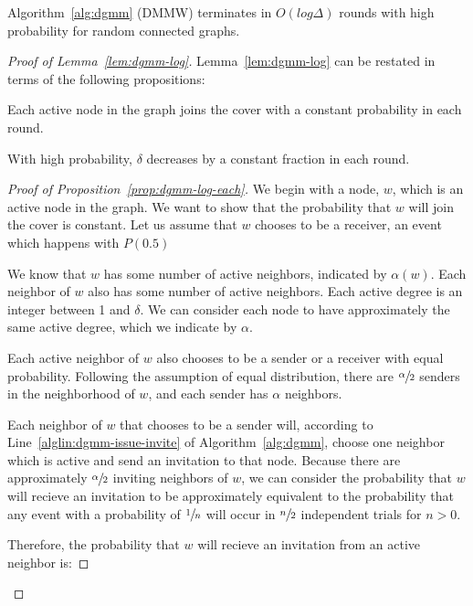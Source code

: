 \begin{lem}
\label{lem:dgmm-log}
Algorithm~\ref{alg:dgmm} (DMMW) terminates in $O(log \Delta)$ rounds with high probability for random connected graphs.
\end{lem}


\begin{proof}[Proof of Lemma~\ref{lem:dgmm-log}]


Lemma~\ref{lem:dgmm-log} can be restated in terms of the following propositions:
\begin{lprp}
\label{prop:dgmm-log-each}
Each active node in the graph joins the cover with a constant probability in each round.
\end{lprp}
\begin{lprp}
\label{prop:dgmm-log-alpha}
With high probability, $\delta$ decreases by a constant fraction in each round.
\end{lprp}
\begin{proof}[Proof of Proposition~\ref{prop:dgmm-log-each}]

We begin with a node, $w$, which is an active node in the graph. We want to show that the probability that $w$ will join the cover is constant. Let us assume that $w$ chooses to be a receiver, an event which happens with $P(0.5)$

We know that $w$ has some number of active neighbors, indicated by $\alpha(w)$. Each neighbor of $w$ also has some number of active neighbors. Each active degree is an integer between 1 and $\delta$. We can consider each node to have approximately the same active degree, which we indicate by $\alpha$. 

Each active neighbor of $w$ also chooses to be a sender or a receiver with equal probability. Following the assumption of equal distribution, there are $\sfrac{\alpha}{2}$ senders in the neighborhood of $w$, and each sender has $\alpha$ neighbors.

Each neighbor of $w$ that chooses to be a sender will, according to Line~\ref{alglin:dgmm-issue-invite} of Algorithm~\ref{alg:dgmm}, choose one neighbor which is active and send an invitation to that node. Because there are approximately $\sfrac{\alpha}{2}$ inviting neighbors of $w$, we can consider the probability that $w$ will recieve an invitation to be approximately equivalent to the probability that any event with a probability of $\sfrac{1}{n}$ will occur in $\sfrac{n}{2}$ independent trials for $n > 0$. 

Therefore, the probability that $w$ will recieve an invitation from an active neighbor is: 


\end{proof}
\end{proof}
